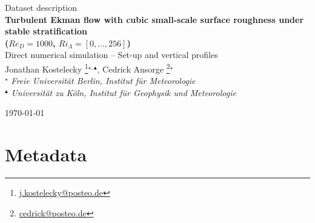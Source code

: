 \documentclass[11pt]{article}
\date{\nodate}
\makeatletter
\newcommand{\dstitle}{Turbulent Ekman flow with cubic small-scale surface roughness under stable stratification \\ ($Re_D=1000$, $Ri_\Lambda=[0,\dots,256]$)}
\newcommand{\subtitle}{Direct numerical simulation -- Set-up and vertical profiles}
\newcommand{\authors}{
    Jonathan Kostelecky \footnote{\href{mailto:j.kostelecky@posteo.de}{j.kostelecky@posteo.de}}$^{\star,\blacktriangle}$, \hspace{0.05cm}  
    Cedrick Ansorge     \footnote{\href{mailto:cedrick@posteo.de}{cedrick@posteo.de}}$^\star$ \\  
    {\small \light{$^\star$ \emph{ Freie Universit\"at Berlin, Institut f\"ur Meteorologie} \\
    $^{\blacktriangle}$ \emph{Universit\"at zu K\"oln, Institut f\"ur Geophysik und Meteorologie}}}}
\newcommand{\light}[1]{\textcolor{black!80}{#1}}
\makeatother
\begin{document}

{\selectfont
\begin{centering}
    \light{\large Dataset description} \\[1em] 
    {\LARGE \bfseries \sffamily\dstitle} \\[1em]
    \light{\large\subtitle} \\[1em]
    \authors \\ 
\end{centering}
\light{\hfill\today}}

\section{Metadata}
\end{document}
